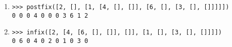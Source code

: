 \documentclass[11pt,a4paper]{article}
\begin{document}
\begin{enumerate}
\item \texttt{>{>}> postfix([2, [], [1, [4, [], []], [6, [], [3, [], []]]]])}\\
\texttt{0 0 0 4 0 0 0 3 6 1 2 }

\item \texttt{>{>}> infix([2, [4, [6, [], []], []], [1, [], [3, [], []]]])}\\
\texttt{0 6 0 4 0 2 0 1 0 3 0 }

\end{enumerate}

\end{document}
